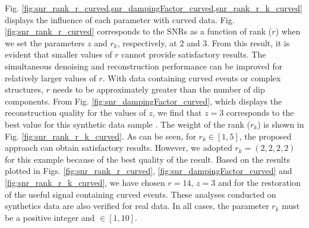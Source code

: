 
Fig. \ref{fig:snr_rank_r_curved,snr_dampingFactor_curved,snr_rank_r_k_curved} displays the influence of each parameter with curved data. Fig. \ref{fig:snr_rank_r_curved} corresponds to the SNRs as a function of rank ($r$) when we set the parameters $z$ and $r_k$, respectively, at $2$ and $3$. From this result, it is evident that smaller values of $r$ cannot provide satisfactory results. The simultaneous denoising and reconstruction performance can be improved for relatively larger values of $r$. With data containing curved events or complex structures, $r$ needs to be approximately greater than the number of dip components.  
From Fig. \ref{fig:snr_dampingFactor_curved}, which displays the reconstruction quality for the values of ${z}$, we find that ${z}=3$ corresponds to the best value for this synthetic data sample . The weight of the rank ($r_k$) is shown in Fig. \ref{fig:snr_rank_r_k_curved}. As can be seen, for $r_k \in [1,5]$, the proposed  approach can obtain satisfactory results. However, we adopted $r_k=(2,2,2,2)$ for this example because of the best quality of the result. Based on the results plotted in Figs. \ref{fig:snr_rank_r_curved}, \ref{fig:snr_dampingFactor_curved} and \ref{fig:snr_rank_r_k_curved}, we have chosen $r=14$, $z=3$ and  for the restoration of the useful signal containing curved events. 
These analyses conducted on synthetics data are also verified for real data.  In all cases, the parameter $r_k$ must be a positive integer and $\in [1,10]$. 

